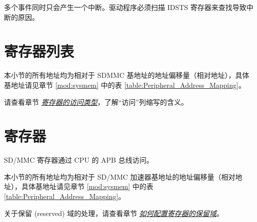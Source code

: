 \documentclass[main\_\_CN.tex]{subfiles}
\begin{document}
多个事件同时只会产生一个中断。驱动程序必须扫描 IDSTS 寄存器来查找导致中断的原因。

\hypertarget{sdhost-reg-summ}{}
\section{寄存器列表}\label{sec:sdmmc-reg-summ}

本小节的所有地址均为相对于 SDMMC 基地址的地址偏移量（相对地址），具体基地址请见章节 \ref{mod:sysmem} \textit{} 中的表 \ref{table:Peripheral_Address_Mapping}。

请查看章节 \hyperref[glossary-access-types]{\textit{寄存器的访问类型}}，了解“访问”列缩写的含义。


\section{寄存器}

SD/MMC 寄存器通过 CPU 的 APB 总线访问。

本小节的所有地址均为相对于 SD/MMC 加速器基地址的地址偏移量（相对地址），具体基地址请见章节 \ref{mod:sysmem} \textit{} 中的表 \ref{table:Peripheral_Address_Mapping}。

关于保留 (reserved) 域的处理，请查看章节 \hyperref[programming-reserved-field]{\textit{如何配置寄存器的保留域}}。


\end{document}
